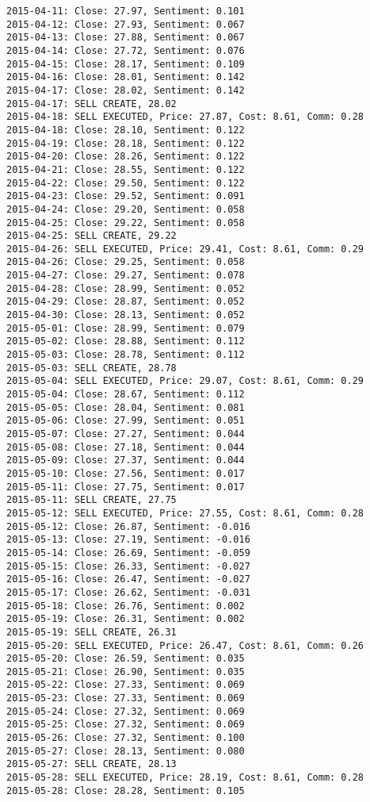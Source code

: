 \documentclass[11pt]{article}
\begin{document}
\begin{Verbatim}[commandchars=\\\{\}]
2015-04-11: Close: 27.97, Sentiment: 0.101
2015-04-12: Close: 27.93, Sentiment: 0.067
2015-04-13: Close: 27.88, Sentiment: 0.067
2015-04-14: Close: 27.72, Sentiment: 0.076
2015-04-15: Close: 28.17, Sentiment: 0.109
2015-04-16: Close: 28.01, Sentiment: 0.142
2015-04-17: Close: 28.02, Sentiment: 0.142
2015-04-17: SELL CREATE, 28.02
2015-04-18: SELL EXECUTED, Price: 27.87, Cost: 8.61, Comm: 0.28
2015-04-18: Close: 28.10, Sentiment: 0.122
2015-04-19: Close: 28.18, Sentiment: 0.122
2015-04-20: Close: 28.26, Sentiment: 0.122
2015-04-21: Close: 28.55, Sentiment: 0.122
2015-04-22: Close: 29.50, Sentiment: 0.122
2015-04-23: Close: 29.52, Sentiment: 0.091
2015-04-24: Close: 29.20, Sentiment: 0.058
2015-04-25: Close: 29.22, Sentiment: 0.058
2015-04-25: SELL CREATE, 29.22
2015-04-26: SELL EXECUTED, Price: 29.41, Cost: 8.61, Comm: 0.29
2015-04-26: Close: 29.25, Sentiment: 0.058
2015-04-27: Close: 29.27, Sentiment: 0.078
2015-04-28: Close: 28.99, Sentiment: 0.052
2015-04-29: Close: 28.87, Sentiment: 0.052
2015-04-30: Close: 28.13, Sentiment: 0.052
2015-05-01: Close: 28.99, Sentiment: 0.079
2015-05-02: Close: 28.88, Sentiment: 0.112
2015-05-03: Close: 28.78, Sentiment: 0.112
2015-05-03: SELL CREATE, 28.78
2015-05-04: SELL EXECUTED, Price: 29.07, Cost: 8.61, Comm: 0.29
2015-05-04: Close: 28.67, Sentiment: 0.112
2015-05-05: Close: 28.04, Sentiment: 0.081
2015-05-06: Close: 27.99, Sentiment: 0.051
2015-05-07: Close: 27.27, Sentiment: 0.044
2015-05-08: Close: 27.18, Sentiment: 0.044
2015-05-09: Close: 27.37, Sentiment: 0.044
2015-05-10: Close: 27.56, Sentiment: 0.017
2015-05-11: Close: 27.75, Sentiment: 0.017
2015-05-11: SELL CREATE, 27.75
2015-05-12: SELL EXECUTED, Price: 27.55, Cost: 8.61, Comm: 0.28
2015-05-12: Close: 26.87, Sentiment: -0.016
2015-05-13: Close: 27.19, Sentiment: -0.016
2015-05-14: Close: 26.69, Sentiment: -0.059
2015-05-15: Close: 26.33, Sentiment: -0.027
2015-05-16: Close: 26.47, Sentiment: -0.027
2015-05-17: Close: 26.62, Sentiment: -0.031
2015-05-18: Close: 26.76, Sentiment: 0.002
2015-05-19: Close: 26.31, Sentiment: 0.002
2015-05-19: SELL CREATE, 26.31
2015-05-20: SELL EXECUTED, Price: 26.47, Cost: 8.61, Comm: 0.26
2015-05-20: Close: 26.59, Sentiment: 0.035
2015-05-21: Close: 26.90, Sentiment: 0.035
2015-05-22: Close: 27.33, Sentiment: 0.069
2015-05-23: Close: 27.33, Sentiment: 0.069
2015-05-24: Close: 27.32, Sentiment: 0.069
2015-05-25: Close: 27.32, Sentiment: 0.069
2015-05-26: Close: 27.32, Sentiment: 0.100
2015-05-27: Close: 28.13, Sentiment: 0.080
2015-05-27: SELL CREATE, 28.13
2015-05-28: SELL EXECUTED, Price: 28.19, Cost: 8.61, Comm: 0.28
2015-05-28: Close: 28.28, Sentiment: 0.105

\end{Verbatim}
\end{document}
